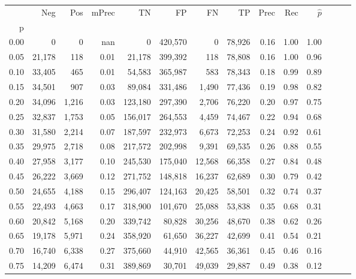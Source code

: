 \begin{tabular}{rrrrrrrrrrrrrr}
\toprule
{} &     Neg &    Pos & mPrec &       TN &       FP &      FN &      TP &  Prec &   Rec & $\hat{p}$ \\
p    &         &        &       &          &          &         &         &       &       &           \\
\midrule
0.00 &       0 &      0 &   nan &        0 &  420,570 &       0 &  78,926 &  0.16 &  1.00 &      1.00 \\
0.05 &  21,178 &    118 &  0.01 &   21,178 &  399,392 &     118 &  78,808 &  0.16 &  1.00 &      0.96 \\
0.10 &  33,405 &    465 &  0.01 &   54,583 &  365,987 &     583 &  78,343 &  0.18 &  0.99 &      0.89 \\
0.15 &  34,501 &    907 &  0.03 &   89,084 &  331,486 &   1,490 &  77,436 &  0.19 &  0.98 &      0.82 \\
0.20 &  34,096 &  1,216 &  0.03 &  123,180 &  297,390 &   2,706 &  76,220 &  0.20 &  0.97 &      0.75 \\
0.25 &  32,837 &  1,753 &  0.05 &  156,017 &  264,553 &   4,459 &  74,467 &  0.22 &  0.94 &      0.68 \\
0.30 &  31,580 &  2,214 &  0.07 &  187,597 &  232,973 &   6,673 &  72,253 &  0.24 &  0.92 &      0.61 \\
0.35 &  29,975 &  2,718 &  0.08 &  217,572 &  202,998 &   9,391 &  69,535 &  0.26 &  0.88 &      0.55 \\
0.40 &  27,958 &  3,177 &  0.10 &  245,530 &  175,040 &  12,568 &  66,358 &  0.27 &  0.84 &      0.48 \\
0.45 &  26,222 &  3,669 &  0.12 &  271,752 &  148,818 &  16,237 &  62,689 &  0.30 &  0.79 &      0.42 \\
0.50 &  24,655 &  4,188 &  0.15 &  296,407 &  124,163 &  20,425 &  58,501 &  0.32 &  0.74 &      0.37 \\
0.55 &  22,493 &  4,663 &  0.17 &  318,900 &  101,670 &  25,088 &  53,838 &  0.35 &  0.68 &      0.31 \\
0.60 &  20,842 &  5,168 &  0.20 &  339,742 &   80,828 &  30,256 &  48,670 &  0.38 &  0.62 &      0.26 \\
0.65 &  19,178 &  5,971 &  0.24 &  358,920 &   61,650 &  36,227 &  42,699 &  0.41 &  0.54 &      0.21 \\
0.70 &  16,740 &  6,338 &  0.27 &  375,660 &   44,910 &  42,565 &  36,361 &  0.45 &  0.46 &      0.16 \\
0.75 &  14,209 &  6,474 &  0.31 &  389,869 &   30,701 &  49,039 &  29,887 &  0.49 &  0.38 &      0.12 \\

\end{tabular}
